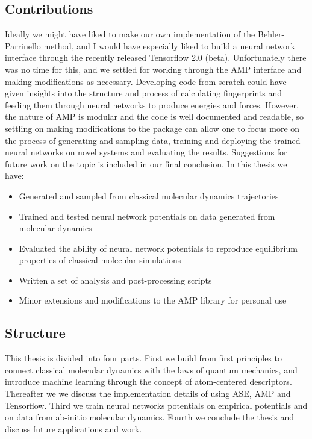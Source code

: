 \subsection{Contributions}
Ideally we might have liked to make our own implementation
of the Behler-Parrinello method,
and I would have especially liked to build a neural network interface
through the recently released Tensorflow 2.0 (beta). Unfortunately there
was no time for this, and we settled for working through the AMP interface
and making modifications as necessary.
Developing code from scratch could have given insights into the structure
and process of calculating fingerprints and feeding them through neural
networks to produce energies and forces. However, the nature of AMP
is modular and the code is well documented and readable, so 
settling on making modifications to the package can allow one to focus
more on the process of generating and sampling data, training and
deploying the trained neural networks on novel systems and evaluating the results.
Suggestions for future work on the topic
is included in our final conclusion.
In this thesis we have:

\begin{itemize}
    \item Generated and sampled from classical
        molecular dynamics trajectories
    \item Trained and tested neural network potentials
        on data generated from molecular dynamics
    \item Evaluated the ability of neural network potentials
        to reproduce equilibrium properties of classical
        molecular simulations
    \item Written a set of analysis and post-processing scripts
    \item Minor extensions and modifications to the AMP library
        for personal use
\end{itemize}

\subsection{Structure}
This thesis is divided into four parts. First we build from first principles
to connect classical molecular dynamics with the laws of quantum mechanics,
and introduce machine learning through the concept of atom-centered descriptors.
Thereafter we we discuss the implementation details of using
ASE, AMP and Tensorflow. Third we train neural networks potentials
on empirical potentials and on data from ab-initio molecular dynamics.
Fourth we conclude the thesis and discuss future applications and work.
